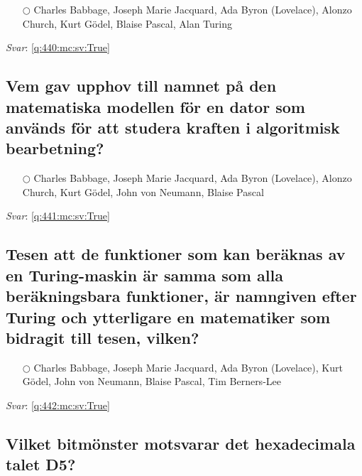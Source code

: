 \documentclass[a4paper,11pt,oneside]{article}
\begin{document}
\begin{sloppypar}
\begin{itemize}
  \item[$\bigcirc$] Charles Babbage, Joseph Marie Jacquard, Ada Byron (Lovelace), Alonzo Church, Kurt G\"odel, Blaise Pascal, Alan Turing
\end{itemize}

\vspace{1cm}

\textit{Svar}: \autoref{q:440:mc:sv:True}



\subsection{Vem gav upphov till namnet p\r{a} den matematiska modellen f\"or en dator som anv\"ands f\"or att studera kraften i algoritmisk bearbetning?}

\label{q:441:mc:sv:False}

\begin{itemize}
  \item[$\bigcirc$] Charles Babbage, Joseph Marie Jacquard, Ada Byron (Lovelace), Alonzo Church, Kurt G\"odel, John von Neumann, Blaise Pascal
\end{itemize}

\vspace{1cm}

\textit{Svar}: \autoref{q:441:mc:sv:True}



\subsection{Tesen att de funktioner som kan ber\"aknas av en Turing-maskin \"ar samma som alla ber\"akningsbara funktioner, \"ar namngiven efter Turing och ytterligare en matematiker som bidragit till tesen, vilken?}

\label{q:442:mc:sv:False}

\begin{itemize}
  \item[$\bigcirc$] Charles Babbage, Joseph Marie Jacquard, Ada Byron (Lovelace), Kurt G\"odel, John von Neumann, Blaise Pascal, Tim Berners-Lee
\end{itemize}

\vspace{1cm}

\textit{Svar}: \autoref{q:442:mc:sv:True}



\subsection{Vilket bitm\"onster motsvarar det hexadecimala talet D5?}


\end{sloppypar}
\end{document}
